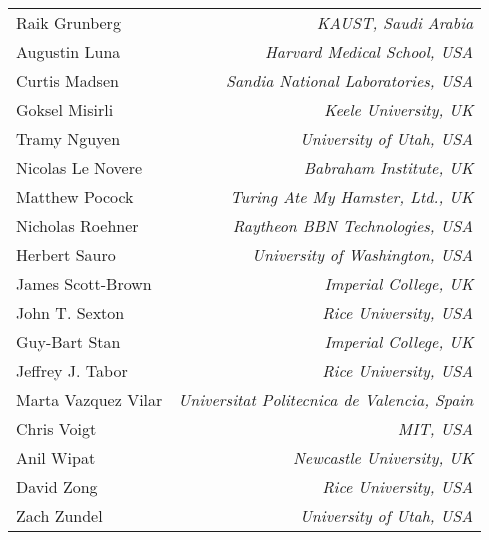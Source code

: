 \documentclass[finalspec]{sbmlpkgspec}
\newcommand{\tododeferred}[1]{\todo[color=cyan, inline]{#1}}
\begin{document}
{\begin{small}
\begin{tabular}{l>{\hspace*{15pt}}r}
Raik Grunberg &\emph{KAUST, Saudi Arabia}\\
Augustin Luna & \emph{Harvard Medical School, USA}\\
Curtis Madsen & \emph{Sandia National Laboratories, USA}\\
Goksel Misirli & \emph{Keele University, UK}\\
Tramy Nguyen & \emph{University of Utah, USA}\\
Nicolas Le Novere & \emph{Babraham Institute, UK}\\
Matthew Pocock & \emph{Turing Ate My Hamster, Ltd., UK}\\
Nicholas Roehner & \emph{Raytheon BBN Technologies, USA}\\
Herbert Sauro & \emph{University of Washington, USA}\\
James Scott-Brown & \emph{Imperial College, UK}\\
John T. Sexton & \emph{Rice University, USA}\\
Guy-Bart Stan & \emph{Imperial College, UK}\\
Jeffrey J. Tabor & \emph{Rice University, USA}\\
Marta Vazquez Vilar & \emph{Universitat Politecnica de Valencia, Spain}\\
Chris Voigt & \emph{MIT, USA}\\
Anil Wipat & \emph{Newcastle University, UK}\\
David Zong & \emph{Rice University, USA}\\
Zach Zundel & \emph{University of Utah, USA}\\
\end{tabular}
\end{small}
}



\maketitlepage

\maketableofcontents














\appendix
\appendixlabels







\newpage
\label{s:bibliography}

\end{document}
